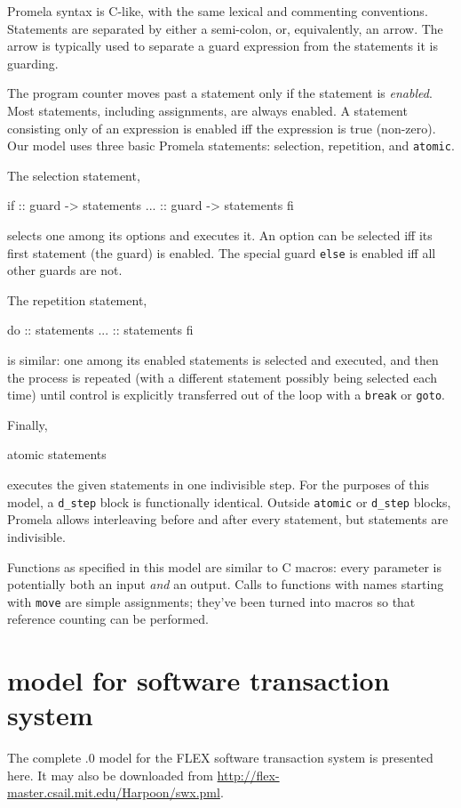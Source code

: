 Promela syntax is C-like, with the same lexical and commenting
conventions.  Statements are separated by either a semi-colon, or,
equivalently, an arrow.  The arrow is typically used to separate a
guard expression from the statements it is guarding.

The program counter moves past a statement only if the statement is
{\it enabled}.  Most
statements, including assignments, are always enabled.
A statement consisting only of an expression is enabled iff the
expression is true (non-zero).
Our model uses three basic Promela statements: selection, repetition,
and {\tt atomic}.

The selection statement,
\begin{inlinecode}
if
:: guard -> statements
...
:: guard -> statements
fi
\end{inlinecode}
selects one among its options and executes it.  An option can be
selected iff its first statement (the guard) is enabled.  The
special guard {\tt else} is enabled iff all other guards are not.

The repetition statement,
\begin{inlinecode}
do
:: statements
...
:: statements
fi
\end{inlinecode}
is similar: one among its enabled statements is selected and executed,
and then the process is repeated (with a different statement possibly
being selected each time) until control is explicitly transferred out
of the loop with a {\tt break} or {\tt goto}.

Finally,
\begin{inlinecode}
atomic { statements }
\end{inlinecode}
executes the given statements in one indivisible step.  For the
purposes of this model, a {\tt d\_step} block is functionally identical.
Outside {\tt atomic} or {\tt d\_step} blocks, Promela allows
interleaving before and after every statement, but statements are
indivisible.

Functions as specified in this model are similar to C macros: every
parameter is potentially both an input {\it and} an output.  Calls to
functions with names starting with {\tt move} are simple assignments;
they've been turned into macros so that reference counting
can be performed.

\section{\Spin model for software transaction system}
The complete .0 model for the FLEX software transaction system is
presented here.  It may also be downloaded from
\url{http://flex-master.csail.mit.edu/Harpoon/swx.pml}.

{\footnotesize}

